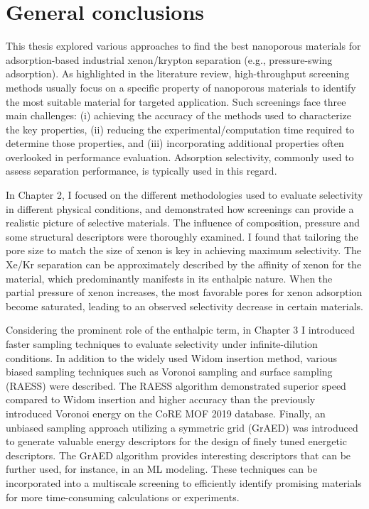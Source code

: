 
\chapter*{General conclusions}

This thesis explored various approaches to find the best nanoporous materials for adsorption-based industrial xenon/krypton separation (e.g., pressure-swing adsorption). As highlighted in the literature review,\autocite{Ren_2022} high-throughput screening methods usually focus on a specific property of nanoporous materials to identify the most suitable material for targeted application. Such screenings face three main challenges: (i) achieving the accuracy of the methods used to characterize the key properties, (ii) reducing the experimental/computation time required to determine those properties, and (iii) incorporating additional properties often overlooked in performance evaluation. Adsorption selectivity, commonly used to assess separation performance, is typically used in this regard.

In Chapter 2, I focused on the different methodologies used to evaluate selectivity in different physical conditions, and demonstrated how screenings can provide a realistic picture of selective materials.\autocite{Ren_2021} The influence of composition, pressure and some structural descriptors were thoroughly examined. I found that tailoring the pore size to match the size of xenon is key in achieving maximum selectivity. The Xe/Kr separation can be approximately described by the affinity of xenon for the material, which predominantly manifests in its enthalpic nature. When the partial pressure of xenon increases, the most favorable pores for xenon adsorption become saturated, leading to an observed selectivity decrease in certain materials.
 
Considering the prominent role of the enthalpic term, in Chapter 3 I introduced faster sampling techniques to evaluate selectivity under infinite-dilution conditions. In addition to the widely used Widom insertion method, various biased sampling techniques such as Voronoi sampling and surface sampling (RAESS) were described. The RAESS algorithm\autocite{Ren_2023} demonstrated superior speed compared to Widom insertion and higher accuracy than the previously introduced Voronoi energy\autocite{Simon_2015} on the CoRE MOF 2019 database. Finally, an unbiased sampling approach utilizing a symmetric grid (GrAED) was introduced to generate valuable energy descriptors for the design of finely tuned energetic descriptors. The GrAED algorithm provides interesting descriptors that can be further used, for instance, in an ML modeling. These techniques can be incorporated into a multiscale screening to efficiently identify promising materials for more time-consuming calculations or experiments.

